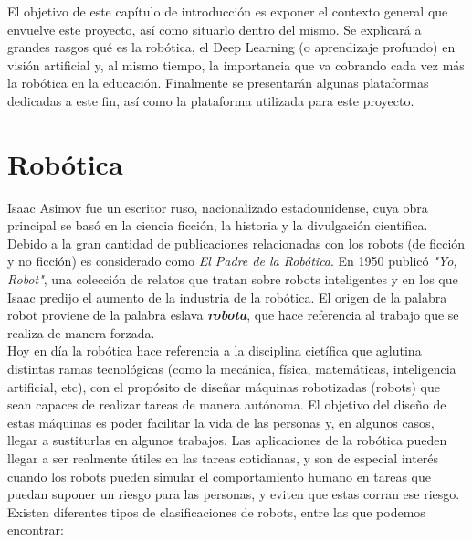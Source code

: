 \documentclass{report}
\begin{document}
El objetivo de este capítulo de introducción es exponer el contexto general que envuelve este proyecto, así como situarlo dentro del mismo. Se explicará a grandes rasgos qué es la robótica, el Deep Learning (o aprendizaje profundo) en visión artificial y, al mismo tiempo, la importancia que va cobrando cada vez más la robótica en la educación. Finalmente se presentarán algunas plataformas dedicadas a este fin, así como la plataforma utilizada para este proyecto.

\section{Robótica}

Isaac Asimov fue un escritor ruso, nacionalizado estadounidense, cuya obra principal se basó en la ciencia ficción, la historia y la divulgación científica. Debido a la gran cantidad de publicaciones relacionadas con los robots (de ficción y no ficción) es considerado como \textit{El Padre de la Robótica}. En 1950 publicó \textit{"Yo, Robot"}, una colección de relatos que tratan sobre robots inteligentes y en los que Isaac predijo el aumento de la industria de la robótica. El origen de la palabra robot proviene de la palabra eslava \textbf{\textit{robota}}, que hace referencia al trabajo que se realiza de manera forzada. 
\\

Hoy en día la robótica hace referencia a la disciplina cietífica que aglutina distintas ramas tecnológicas (como la mecánica, física, matemáticas, inteligencia artificial, etc), con el propósito de diseñar máquinas robotizadas (robots) que sean capaces de realizar tareas de manera autónoma. El objetivo del diseño de estas máquinas es poder facilitar la vida de las personas y, en algunos casos, llegar a sustiturlas en algunos trabajos. Las aplicaciones de la robótica pueden llegar a ser realmente útiles en las tareas cotidianas, y son de especial interés  cuando los robots pueden simular el comportamiento humano en tareas que puedan suponer un riesgo para las personas, y eviten que estas corran ese riesgo.
\\

Existen diferentes tipos de clasificaciones de robots, entre las que podemos encontrar:
\end{document}
